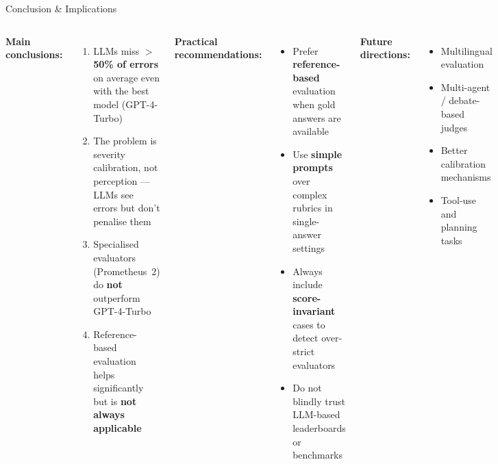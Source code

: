 \documentclass[aspectratio=169,10pt]{beamer}
\newcommand{\good}[1]{\textcolor{green!60!black}{\textbf{#1}}}
\newcommand{\bad}[1]{\textcolor{aclred}{\textbf{#1}}}
\begin{document}
\begin{frame}{Conclusion \& Implications}
  \begin{columns}[T]
      \textbf{Main conclusions:}
      \begin{enumerate}
        \item LLMs miss \bad{$>$50\% of errors} on average even with the best model (GPT-4-Turbo)
        \item The problem is \alert{severity calibration}, not perception — LLMs see errors but don't penalise them
        \item Specialised evaluators (Prometheus~2) do \bad{not} outperform GPT-4-Turbo
        \item Reference-based evaluation helps significantly but is \bad{not always applicable}
      \end{enumerate}

      \textbf{Practical recommendations:}
      \begin{itemize}
        \item[\checkmark] Prefer \good{reference-based} evaluation when gold answers are available
        \item[\checkmark] Use \good{simple prompts} over complex rubrics in single-answer settings
        \item[\checkmark] Always include \good{score-invariant} cases to detect over-strict evaluators
        \item[$\times$] Do not blindly trust LLM-based leaderboards or benchmarks
      \end{itemize}

      \vspace{0.4em}
      \textbf{Future directions:}
      \begin{itemize}
        \item Multilingual evaluation
        \item Multi-agent / debate-based judges
        \item Better calibration mechanisms
        \item Tool-use and planning tasks
      \end{itemize}
  \end{columns}
\end{frame}
\end{document}

